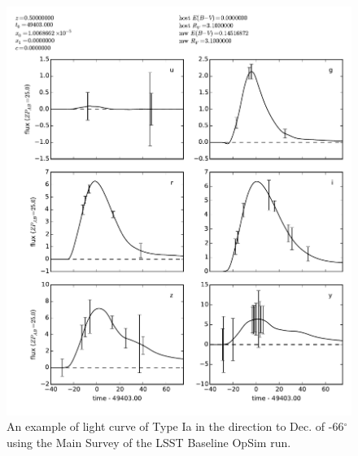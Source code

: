 \begin{figure}[tbh!]
\includegraphics[angle=0,width=0.99\hsize:,clip]{figs/supernova/s1_lc_coaddedDecminus66RA115.pdf}
\caption{An example of light curve of Type Ia in the direction to Dec. of -66$^{\circ}$
 using the Main Survey of the LSST Baseline OpSim run.
}
\label{fig:SNIaLCminus66}
\end{figure}


